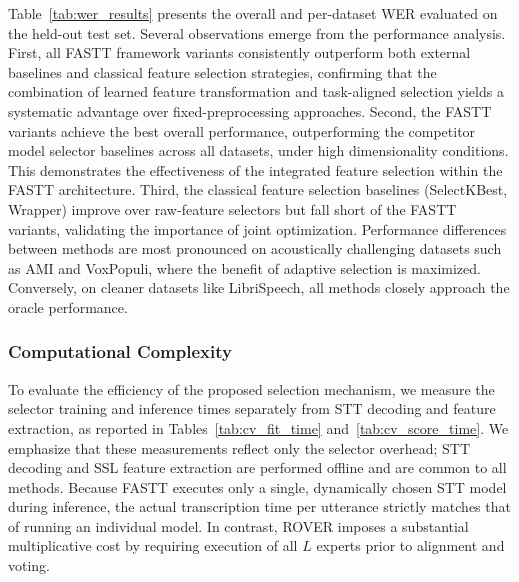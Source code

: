 \documentclass[journal]{IEEEtran}
\begin{document}
    Table~\ref{tab:wer_results} presents the overall and per-dataset WER evaluated
    on the held-out test set.
    Several observations emerge from the performance analysis. First, all FASTT
    framework variants consistently outperform both external baselines and
    classical feature selection strategies, confirming that the combination of learned
    feature transformation and task-aligned selection yields a systematic advantage
    over fixed-preprocessing approaches. Second, the FASTT variants achieve the best
    overall performance, outperforming the competitor model selector baselines
    across all datasets, under high dimensionality conditions. This demonstrates
    the effectiveness of the integrated feature selection within the FASTT
    architecture. Third, the classical feature selection baselines (SelectKBest,
    Wrapper) improve over raw-feature selectors but fall short of the FASTT variants,
    validating the importance of joint optimization. Performance differences between
    methods are most pronounced on acoustically challenging datasets such as AMI
    and VoxPopuli, where the benefit of adaptive selection is maximized. Conversely,
    on cleaner datasets like LibriSpeech, all methods closely approach the oracle
    performance.

    

    \subsubsection{Computational Complexity}
    To evaluate the efficiency of the proposed selection mechanism, we measure the
    selector training and inference times separately from STT decoding and feature
    extraction, as reported in Tables~\ref{tab:cv_fit_time} and~\ref{tab:cv_score_time}.
    We emphasize that these measurements reflect only the selector overhead; STT
    decoding and SSL feature extraction are performed offline and are common to
    all methods. Because FASTT executes only a single, dynamically chosen STT
    model during inference, the actual transcription time per utterance strictly
    matches that of running an individual model. In contrast, ROVER imposes a substantial
    multiplicative cost by requiring execution of all $L$ experts prior to alignment
    and voting.
\end{document}
